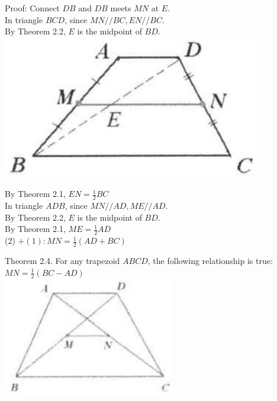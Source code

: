 \documentclass{article}
\begin{document}
Proof:
Connect \(D B\) and \(D B\) meets \(M N\) at \(E\).\\
In triangle \(B C D\), since \(M N / / B C, E N / / B C\).\\
By Theorem 2.2, \(E\) is the midpoint of \(B D\).\\
\centering
\includegraphics[width=\textwidth]{images/034(2).jpg}

By Theorem 2.1, \(E N=\frac{1}{2} B C\)\\
In triangle \(A D B\), since \(M N / / A D, M E / / A D\).\\
By Theorem 2.2, \(E\) is the midpoint of \(B D\).\\
By Theorem 2.1, \(M E=\frac{1}{2} A D\)\\
(2) \(+(1): M N=\frac{1}{2}(A D+B C)\)

Theorem 2.4. For any trapezoid \(A B C D\), the following relationship is true:\\
\(M N=\frac{1}{2}(B C-A D)\)\\
\centering
\includegraphics[width=\textwidth]{images/034.jpg}
\end{document}
